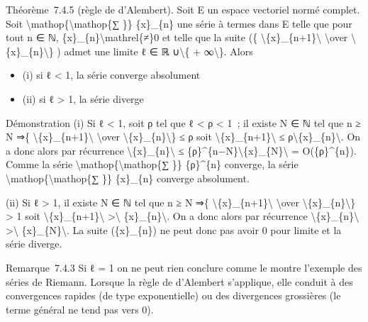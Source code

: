 \documentclass[]{article}
\begin{document}
Théorème~7.4.5 (règle de d'Alembert). Soit E un espace vectoriel normé
complet. Soit \textbackslash{}mathop\{\textbackslash{}mathop\{∑ \}\}
\{x\}\_\{n\} une série à termes dans E telle que pour tout n ∈ ℕ,
\{x\}\_\{n\}\textbackslash{}mathrel\{≠\}0 et telle que la suite (\{
\textbackslash{}\textbar{}\{x\}\_\{n+1\}\textbackslash{}\textbar{}
\textbackslash{}over
\textbackslash{}\textbar{}\{x\}\_\{n\}\textbackslash{}\textbar{}\} )
admet une limite ℓ ∈ ℝ ∪\textbackslash{}\{ + ∞\textbackslash{}\}. Alors

\begin{itemize}
\itemsep1pt\parskip0pt
\item
  (i) si ℓ \textless{} 1, la série converge absolument
\item
  (ii) si ℓ \textgreater{} 1, la série diverge
\end{itemize}

Démonstration (i) Si ℓ \textless{} 1, soit ρ tel que ℓ \textless{} ρ
\textless{} 1~; il existe N ∈ ℕ tel que n ≥ N ⇒\{
\textbackslash{}\textbar{}\{x\}\_\{n+1\}\textbackslash{}\textbar{}
\textbackslash{}over
\textbackslash{}\textbar{}\{x\}\_\{n\}\textbackslash{}\textbar{}\} ≤ ρ
soit \textbackslash{}\textbar{}\{x\}\_\{n+1\}\textbackslash{}\textbar{}
≤ ρ\textbackslash{}\textbar{}\{x\}\_\{n\}\textbackslash{}\textbar{}. On
a donc alors par récurrence
\textbackslash{}\textbar{}\{x\}\_\{n\}\textbackslash{}\textbar{} ≤
\{ρ\}\^{}\{n−N\}\textbackslash{}\textbar{}\{x\}\_\{N\}\textbackslash{}\textbar{}
= O(\{ρ\}\^{}\{n\}). Comme la série
\textbackslash{}mathop\{\textbackslash{}mathop\{∑ \}\} \{ρ\}\^{}\{n\}
converge, la série \textbackslash{}mathop\{\textbackslash{}mathop\{∑
\}\} \{x\}\_\{n\} converge absolument.

(ii) Si ℓ \textgreater{} 1, il existe N ∈ ℕ tel que n ≥ N ⇒\{
\textbackslash{}\textbar{}\{x\}\_\{n+1\}\textbackslash{}\textbar{}
\textbackslash{}over
\textbackslash{}\textbar{}\{x\}\_\{n\}\textbackslash{}\textbar{}\}
\textgreater{} 1 soit
\textbackslash{}\textbar{}\{x\}\_\{n+1\}\textbackslash{}\textbar{}
\textgreater{}\textbackslash{}\textbar{}
\{x\}\_\{n\}\textbackslash{}\textbar{}. On a donc alors par récurrence
\textbackslash{}\textbar{}\{x\}\_\{n\}\textbackslash{}\textbar{}
\textgreater{}\textbackslash{}\textbar{}
\{x\}\_\{N\}\textbackslash{}\textbar{}. La suite (\{x\}\_\{n\}) ne peut
donc pas avoir 0 pour limite et la série diverge.

Remarque~7.4.3 Si ℓ = 1 on ne peut rien conclure comme le montre
l'exemple des séries de Riemann. Lorsque la règle de d'Alembert
s'applique, elle conduit à des convergences rapides (de type
exponentielle) ou des divergences grossières (le terme général ne tend
pas vers 0).
\end{document}
